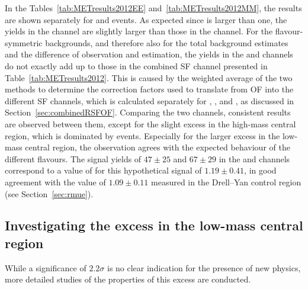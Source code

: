 
In the Tables~\ref{tab:METresults2012EE} and~\ref{tab:METresults2012MM}, the results are shown separately for \EE and \MM events. As expected since \rmue is larger than one, the yields in the \MM channel are slightly larger than those in the \EE channel. For the flavour-symmetric backgrounds, and therefore also for the total background estimates and the difference of observation and estimation, the yields in the \EE and \MM channels do not exactly add up to those in the combined SF channel presented in Table~\ref{tab:METresults2012}. This is caused by the weighted average of the two methods to determine the correction factors used to translate from OF into the different SF channels, which is calculated separately for \Rsfof, \Reeof, and \Rmmof, as discussed in Section~\ref{sec:combinedRSFOF}. Comparing the two channels, consistent results are observed between them, except for the slight excess in the high-mass central region, which is dominated by \EE events. Especially for the larger excess in the low-mass central region, the observation agrees with the expected behaviour of the different flavours. The signal yields of $47\pm25$ and $67\pm29$ in the \EE and \MM channels correspond to a value of \rmue for this hypothetical signal of $1.19\pm0.41$, in good agreement with the value of $1.09\pm0.11$ measured in the Drell--Yan control region (see Section~\ref{sec:rmue}).





\subsection*{Investigating the excess in the low-mass central region}
While a significance of $2.2\sigma$ is no clear indication for the presence of new physics, more detailed studies of the properties of this excess are conducted. 

